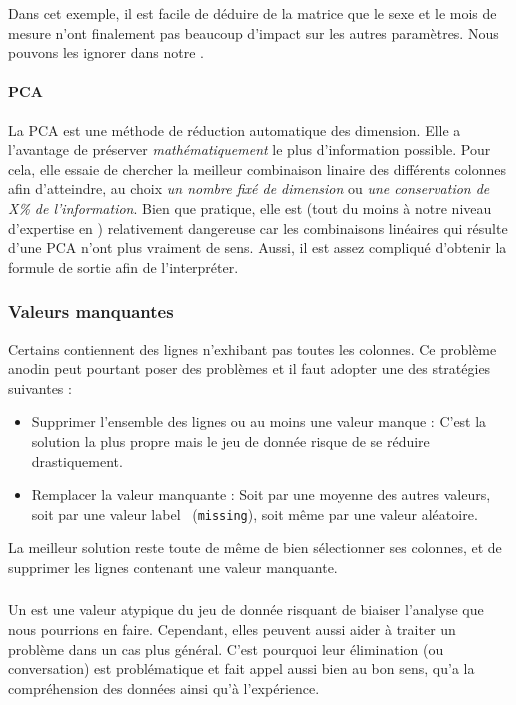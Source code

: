 Dans cet exemple, il est facile de déduire de la matrice que le sexe et le mois de mesure n'ont finalement pas beaucoup d'impact sur les autres paramètres. Nous pouvons les ignorer dans notre .

\paragraph{PCA}
La \gls{PCA} est une méthode de réduction automatique des dimension. Elle a l'avantage de préserver \textsl{mathématiquement} le plus d'information possible. Pour cela, elle essaie de chercher la meilleur combinaison linaire des différents colonnes afin d'atteindre, au choix \emph{un nombre fixé de dimension} ou \emph{une conservation de X\% de l'information}.
Bien que pratique, elle est (tout du moins à notre niveau d'expertise en ) relativement dangereuse car les combinaisons linéaires qui résulte d'une \gls{PCA} n'ont plus vraiment de sens. Aussi, il est assez compliqué d'obtenir la formule de sortie afin de l'interpréter.

\subsubsection{Valeurs manquantes}
Certains  contiennent des lignes n'exhibant pas toutes les colonnes. Ce problème anodin peut pourtant poser des problèmes et il faut adopter une des stratégies suivantes :
\begin{itemize}
	\item Supprimer l'ensemble des lignes ou au moins une valeur manque : C'est la solution la plus propre mais le jeu de donnée risque de se réduire drastiquement.
	\item Remplacer la valeur manquante : Soit par une moyenne des autres valeurs, soit par une valeur \og label\fg~ (\eg \texttt{missing}), soit même par une valeur aléatoire.
\end{itemize}
La meilleur solution reste toute de même de bien sélectionner ses colonnes, et de supprimer les lignes contenant une valeur manquante.

\subsubsection{}
Un  est une valeur atypique du jeu de donnée risquant de biaiser l'analyse que nous pourrions en faire. Cependant, elles peuvent aussi aider à traiter un problème dans un cas plus général. C'est pourquoi leur élimination (ou conversation) est problématique et fait appel aussi bien au bon sens, qu'a la compréhension des données ainsi qu'à l'expérience.

